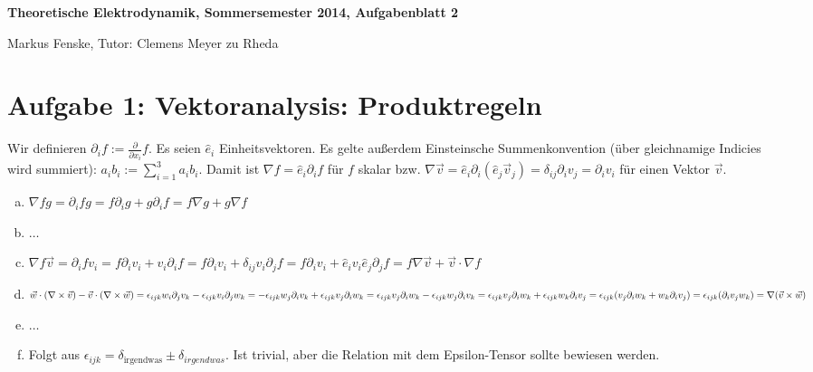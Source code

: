\documentclass[a4paper,german,12pt,smallheadings]{scrartcl}
\begin{document}
\allowdisplaybreaks %
\begin{center}
\bfseries %
\sffamily %
\vspace{-40pt}
Theoretische Elektrodynamik, Sommersemester 2014, Aufgabenblatt 2

Markus Fenske, Tutor: Clemens Meyer zu Rheda
\vspace{-10pt}
\end{center}

\section*{Aufgabe 1: Vektoranalysis: Produktregeln}

Wir definieren $\partial_i f := \frac{\partial}{\partial x_i} f$.
Es seien $\hat{e}_i$ Einheitsvektoren.
Es gelte außerdem Einsteinsche Summenkonvention (über gleichnamige Indicies
wird summiert): $a_ib_i := \sum_{i=1}^3 a_ib_i$.
Damit ist $\nabla f = \hat{e}_i \partial_i f$ für $f$ skalar bzw. $\nabla
\vec{v} = \hat{e}_i \partial_i (\hat{e}_j \vec{v}_j) = \delta_{ij} \partial_i
v_j = \partial_i v_i$ für einen Vektor $\vec{v}$.

\begin{enumerate}[a)]
  \item $\nabla fg = \partial_i f g = f \partial_i g + g \partial_i f = f \nabla g + g \nabla f$
  \item $\dots$
  \item $\nabla f \vec{v}
    = \partial_i f v_i
    = f \partial_i v_i + v_i \partial_i f
    = f \partial_i v_i + \delta_{ij} v_i \partial_j f
    = f \partial_i v_i + \hat{e}_iv_i \hat{e}_j \partial_j f
    = f \nabla \vec{v} + \vec{v} \cdot \nabla f$
  \item $\vec{w} \cdot (\nabla \times \vec{v}) - \vec{v} \cdot (\nabla \times \vec{w})
    = \epsilon_{ijk}w_i\partial_jv_k - \epsilon_{ijk} v_i \partial_j w_k
    = -\epsilon_{ijk} w_j \partial_ iv_k + \epsilon_{ijk} v_j \partial_i w_k \\
    =  \epsilon_{ijk} v_j \partial_i w_k - \epsilon_{ijk} w_j \partial_i v_k
    =  \epsilon_{ijk} v_j \partial_i w_k + \epsilon_{ijk} w_k \partial_i v_j
    =  \epsilon_{ijk} (v_j \partial_i w_k + w_k \partial_i v_j) \\
    =  \epsilon_{ijk} (\partial_i v_j w_k)
    = \nabla (\vec{v} \times \vec{w})$
  \item $\dots$
  \item Folgt aus $\epsilon_{ijk} = \delta_\text{irgendwas} \pm
    \delta_{irgendwas}$. Ist trivial, aber die Relation mit dem Epsilon-Tensor
    sollte bewiesen werden.
\end{enumerate}
\end{document}
